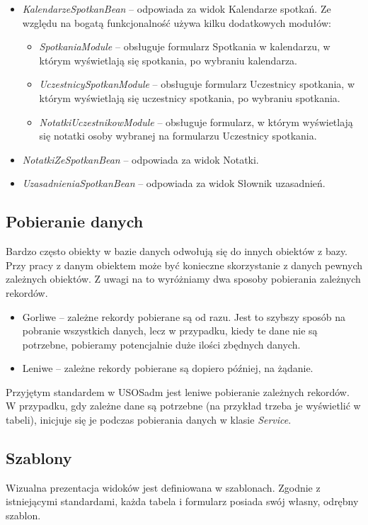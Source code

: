 \documentclass[licencjacka]{pracamgr}
\begin{document}
\begin{itemize}
\item \textsl{KalendarzeSpotkanBean} -- odpowiada za widok Kalendarze spotkań. Ze względu na bogatą funkcjonalność używa kilku dodatkowych modułów:
\begin{itemize}
\item \textsl{SpotkaniaModule} -- obsługuje formularz Spotkania w kalendarzu, w którym wyświetlają się spotkania, po wybraniu kalendarza.
\item \textsl{UczestnicySpotkanModule} -- obsługuje formularz Uczestnicy spotkania, w którym wyświetlają się uczestnicy spotkania, po wybraniu spotkania.
\item \textsl{NotatkiUczestnikowModule} -- obsługuje formularz, w którym wyświetlają się notatki osoby wybranej na formularzu Uczestnicy spotkania.
\end{itemize}
\item \textsl{NotatkiZeSpotkanBean} -- odpowiada za widok Notatki.
\item \textsl{UzasadnieniaSpotkanBean} -- odpowiada za widok Słownik uzasadnień.
\end{itemize}

\subsection{Pobieranie danych}
Bardzo często obiekty w bazie danych odwołują się do innych obiektów z bazy. Przy pracy z danym obiektem może być konieczne skorzystanie z danych pewnych zależnych obiektów. Z uwagi na to wyróżniamy dwa sposoby pobierania zależnych rekordów.

\begin{itemize}
\item Gorliwe -- zależne rekordy pobierane są od razu. Jest to szybszy sposób na pobranie wszystkich danych, lecz w przypadku, kiedy te dane nie są potrzebne, pobieramy potencjalnie duże ilości zbędnych danych.
\item Leniwe -- zależne rekordy pobierane są dopiero później, na żądanie.
\end{itemize}

Przyjętym standardem w USOSadm jest leniwe pobieranie zależnych rekordów. W przypadku, gdy zależne dane są potrzebne (na przykład trzeba je wyświetlić w tabeli), inicjuje się je podczas pobierania danych w klasie \textsl{Service}.

\subsection{Szablony}
Wizualna prezentacja widoków jest definiowana w szablonach. Zgodnie z istniejącymi standardami, każda tabela i formularz posiada swój własny, odrębny szablon.
\end{document}
